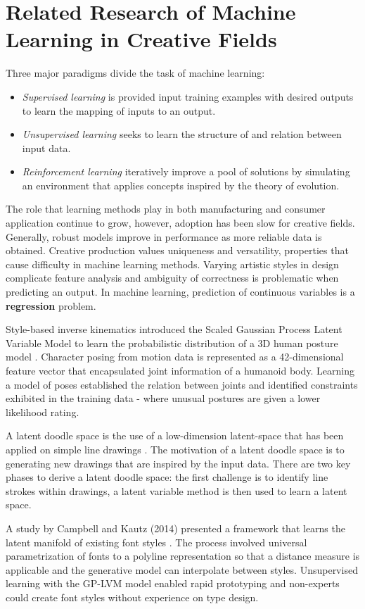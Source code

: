 \documentclass[ %
author={Dillon Keith Diep},
supervisor={Dr. Carl Henrik Ek},
degree={MEng},
title={ART-CG Hair:},
subtitle={Assisted Real-time Content Generation of Stylised Virtual Hair},
type={Research},
year={2017} ]{dissertation}
\begin{document}
\section{Related Research of Machine Learning in Creative Fields}
Three major paradigms divide the task of machine learning:
\begin{itemize}
	\item \textit{Supervised learning} is provided input training examples with desired outputs to learn the mapping of inputs to an output.
	\item \textit{Unsupervised learning} seeks to learn the structure of and relation between input data.
	\item \textit{Reinforcement learning} iteratively improve a pool of solutions by simulating an environment that applies concepts inspired by the theory of evolution.
\end{itemize}
The role that learning methods play in both manufacturing and consumer application continue to grow, however, adoption has been slow for creative fields.  Generally, robust models improve in performance as more reliable data is obtained. Creative production values uniqueness and versatility, properties that cause difficulty in machine learning methods. Varying artistic styles in design complicate feature analysis and ambiguity of correctness is problematic when predicting an output. In machine learning, prediction of continuous variables is a \textbf{regression} problem. 

Style-based inverse kinematics introduced the Scaled Gaussian Process Latent Variable Model to learn the probabilistic distribution of a 3D human posture model \cite{styleik}. Character posing from motion data is represented as a 42-dimensional feature vector that encapsulated joint information of a humanoid body. Learning a model of poses established the relation between joints and identified constraints exhibited in the training data - where unusual postures are given a lower likelihood rating.

A latent doodle space is the use of a low-dimension latent-space that has been applied on simple line drawings \cite{latentdoodle}. The motivation of a latent doodle space is to generating new drawings that are inspired by the input data. There are two key phases to derive a latent doodle space: the first challenge is to identify line strokes within drawings, a latent variable method is then used to learn a latent space.

A study by Campbell and Kautz (2014) presented a framework that learns the latent manifold of existing font styles \cite{fontmanifold}. The process involved universal parametrization of fonts to a polyline representation so that a distance measure is applicable and the generative model can interpolate between styles. Unsupervised learning with the GP-LVM model enabled rapid prototyping and non-experts could create font styles without experience on type design.
\end{document}
